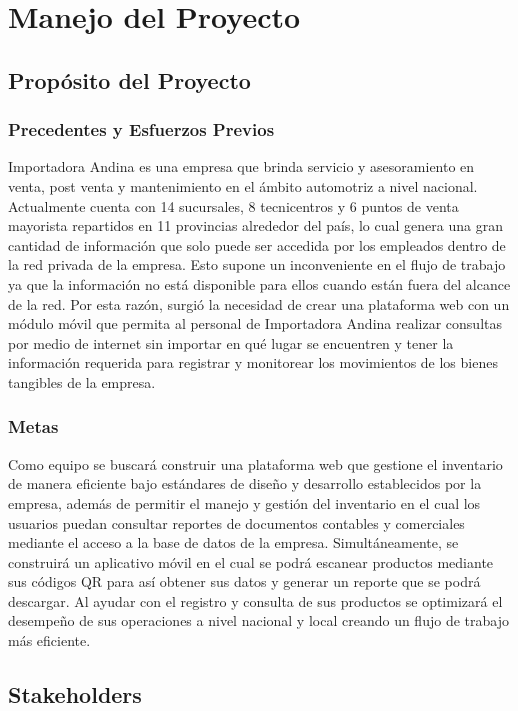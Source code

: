 \documentclass{scrreprt}
\begin{document}
\chapter{Manejo del Proyecto}

\section{Propósito del Proyecto}
\subsection{Precedentes y Esfuerzos Previos}
Importadora Andina es una empresa que brinda servicio y asesoramiento en venta, post venta y mantenimiento en el ámbito automotriz a nivel nacional. Actualmente cuenta con 14 sucursales, 8 tecnicentros y 6 puntos de venta mayorista repartidos en 11 provincias alrededor del país, lo cual genera una gran cantidad de información que solo puede ser accedida por los empleados dentro de la red privada de la empresa. Esto supone un inconveniente en el flujo de trabajo ya que la información no está disponible para ellos cuando están fuera del alcance de la red. Por esta razón, surgió la necesidad de crear una plataforma web con un módulo móvil que permita al personal de Importadora Andina realizar consultas por medio de internet sin importar en qué lugar se encuentren y tener la información requerida para registrar y monitorear los movimientos de los bienes tangibles de la empresa.

\subsection{Metas}
Como equipo se buscará construir una plataforma web que gestione el inventario de manera eficiente bajo estándares de diseño y desarrollo establecidos por la empresa, además de permitir el manejo y gestión del inventario en el cual los usuarios puedan consultar reportes de documentos contables y comerciales mediante el acceso a la base de datos de la empresa. Simultáneamente, se construirá un aplicativo móvil en el cual se podrá escanear productos mediante sus códigos QR para así obtener sus datos y generar un reporte que se podrá descargar.
Al ayudar con el registro y consulta de sus productos se optimizará el desempeño de sus operaciones a nivel nacional y local creando un flujo de trabajo más eficiente. 

\section{Stakeholders}
\end{document}
